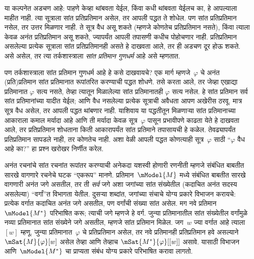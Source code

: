 या कल्पनेत अडचण आहे:
पाहणे केव्हा थांबवता येईल,
किंवा कधी थांबवता येईलच का,
हे आपल्याला माहीत नाही.
त्या सूत्राला सांत
प्रतिप्रतिमान असेल, तर आपली
पद्धत ते शोधेल. पण सांत
प्रतिप्रतिमान नसेल, तर
उत्तर मिळणार नाही.
ते सूत्र वैध असू शकते
(म्हणजे कोणतेच प्रतिप्रतिमान
नसते), किंवा त्याला केवळ
अनंत प्रतिप्रतिमान असू शकते,
ज्यापर्यंत आपली तपासणी
कधीच पोहोचणार नाही.
प्रतिप्रतिमान असलेल्या प्रत्येक
सूत्राला सांत प्रतिप्रतिमानही
असते हे दाखवता आले, तर
ही अडचण दूर होऊ शकते.
असे असेल, तर त्या तर्कशास्त्राला
\emph{सांत प्रतिमान गुणधर्म}
आहे असे म्हणतात.

पण तर्कशास्त्राला सांत प्रतिमान
गुणधर्म आहे हे कसे दाखवायचे?
एक मार्ग म्हणजे~$\varphi$ चे
अनंत (प्रति)प्रतिमान सांत
प्रतिमानात रूपांतरित करण्याची
पद्धत शोधणे. तसे करता आले,
तर जेव्हा एखाद्या प्रतिमानात
$\varphi$ सत्य नसते, तेव्हा
त्यातून मिळालेल्या सांत
प्रतिमानातही $\varphi$ सत्य
नसेल. हे सांत प्रतिमान
सर्व सांत प्रतिमानांच्या
यादीत येईल; आणि वैध
नसलेल्या प्रत्येक सूत्राची
अवैधता आपण अखेरीस ठरवू.
मात्र सूत्र वैध असेल, तर
आपली पद्धत थांबणार नाही.
याशिवाय या पद्धतीतून
मिळणाऱ्या सांत प्रतिमानाच्या
आकाराला कमाल मर्यादा आहे
आणि ती मर्यादा केवळ
सूत्र~$\varphi$ पासून प्रभावीपणे काढता येते
हे दाखवता आले, तर
प्रतिप्रतिमान शोधताना
किती आकारापर्यंत सांत
प्रतिमाने तपासायची हे कळेल.
तेवढ्यापर्यंत प्रतिप्रतिमान
सापडले नाही, तर कोणतेच
नाही. अशा वेळी आपली
पद्धत कोणत्याही
सूत्र~$\varphi$ साठी
“$\varphi$ वैध आहे का?” हा
प्रश्न खरोखर निर्णीत करेल.

अनंत रचनांचे सांत रचनांत
रूपांतर करण्याची अनेकदा
यशस्वी होणारी रणनीती म्हणजे
संबंधित बाबतीत सारखे
वागणारे रचनेचे घटक
“एकरूप” मानणे. प्रतिमान~$\mModel{M}$
मध्ये संबंधित बाबतीत सारखे
वागणारी अनंत जगे असतील,
तर ती \emph{सर्व} जगे अशा
जगांच्या सांत संख्येतील
(कदाचित अनंत सदस्य असलेल्या)
“वर्गां”त विभागता येतील.
दुसऱ्या शब्दांत, जगांच्या
संचाचे योग्य प्रकारे विभाजन
करायचे: प्रत्येक वर्गात
कदाचित अनंत जगे असतील,
पण वर्गांची संख्या सांत असेल.
मग नवे प्रतिमान~$\mModel{M^*}$
परिभाषित करू; त्याची जगे
म्हणजे हे वर्ग. जुन्या
प्रतिमानातील सांत संख्येतील
वर्गांमुळे नव्या प्रतिमानात
सांत संख्येने जगे असतील,
म्हणजे सांत प्रतिमान मिळेल.
जग~$w$ ज्या वर्गात आहे
त्याला $[w]$ म्हणू.
जुन्या प्रतिमानात~$\varphi$ चे
प्रतिप्रतिमान असेल, तर नवे
प्रतिमानही प्रतिप्रतिमान
हवे असल्याने
$\mSat{M}{\varphi}[w]$ असेल
तेव्हा आणि तेव्हाच
$\mSat{M^*}{\varphi}[{[w]}]$
असावे. यासाठी विभाजन
आणि~$\mModel{M^*}$ चा
प्राप्यता संबंध योग्य
प्रकारे परिभाषित करावा लागतो.

